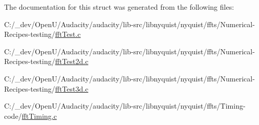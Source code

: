 The documentation for this struct was generated from the following files\+:\begin{DoxyCompactItemize}
\item 
C\+:/\+\_\+dev/\+Open\+U/\+Audacity/audacity/lib-\/src/libnyquist/nyquist/ffts/\+Numerical-\/\+Recipes-\/testing/\hyperlink{fft_test_8c}{fft\+Test.\+c}\item 
C\+:/\+\_\+dev/\+Open\+U/\+Audacity/audacity/lib-\/src/libnyquist/nyquist/ffts/\+Numerical-\/\+Recipes-\/testing/\hyperlink{fft_test2d_8c}{fft\+Test2d.\+c}\item 
C\+:/\+\_\+dev/\+Open\+U/\+Audacity/audacity/lib-\/src/libnyquist/nyquist/ffts/\+Numerical-\/\+Recipes-\/testing/\hyperlink{fft_test3d_8c}{fft\+Test3d.\+c}\item 
C\+:/\+\_\+dev/\+Open\+U/\+Audacity/audacity/lib-\/src/libnyquist/nyquist/ffts/\+Timing-\/code/\hyperlink{fft_timing_8c}{fft\+Timing.\+c}\end{DoxyCompactItemize}

